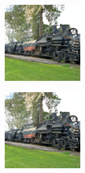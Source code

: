 \documentclass{article}
\begin{document}
\begin{figure}
\begin{subfigure}[b]{0.5\linewidth}
\begin{subfigure}[b]{0.242\linewidth}
        \end{subfigure}
        \begin{subfigure}[b]{0.242\linewidth}
        \includegraphics[width=\linewidth]{figures/imagenet128/solver_samples/imagenet128_fm_ot_72_20.png}
        \end{subfigure}
        \begin{subfigure}[b]{0.242\linewidth}
        \includegraphics[width=\linewidth]{figures/imagenet128/solver_samples/imagenet128_fm_ot_72_50.png}
        \end{subfigure}
    \end{subfigure}\\
    

\end{figure}
\end{document}
